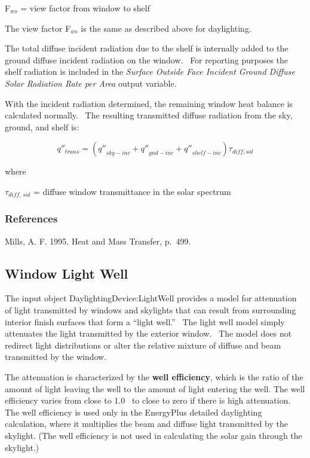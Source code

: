 F\(_{ws}\) = view factor from window to shelf

The view factor F\(_{ws}\) is the same as described above for daylighting.

The total diffuse incident radiation due to the shelf is internally added to the ground diffuse incident radiation on the window.~ For reporting purposes the shelf radiation is included in the \emph{Surface Outside Face Incident Ground Diffuse Solar Radiation Rate per Area} output variable.

With the incident radiation determined, the remaining window heat balance is calculated normally.~ The resulting transmitted diffuse radiation from the sky, ground, and shelf is:

\begin{equation}
{q''_{trans}} = \left( {{{q''}_{sky - inc}} + {{q''}_{gnd - inc}} + {{q''}_{shelf - inc}}} \right){\tau_{diff,sol}}
\end{equation}

where

\(\tau_{diff,\, sol}\) = diffuse window transmittance in the solar spectrum

\subsubsection{References}\label{references-1-006}

Mills, A. F. 1995. Heat and Mass Transfer, p.~499.

\subsection{Window Light Well}\label{window-light-well}

The input object DaylightingDevice:LightWell provides a model for attenuation of light transmitted by windows and skylights that can result from surrounding interior finish surfaces that form a ``light well.''~ The light well model simply attenuates the light transmitted by the exterior window.~ The model does not redirect light distributions or alter the relative mixture of diffuse and beam transmitted by the window.

The attenuation is characterized by the \textbf{well efficiency}, which is the ratio of the amount of light leaving the well to the amount of light entering the well. The well efficiency varies from close to 1.0~ to close to zero if there is high attenuation. The well efficiency is used only in the EnergyPlus detailed daylighting calculation, where it multiplies the beam and diffuse light transmitted by the skylight. (The well efficiency is not used in calculating the solar gain through the skylight.)

